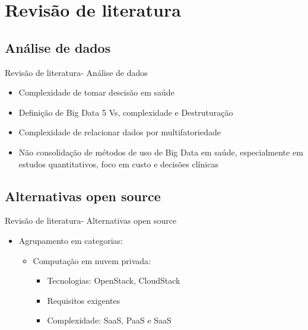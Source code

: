\documentclass[10pt,brazil]{beamer}
\theoremstyle{definition}
\begin{document}
\section{Revisão de literatura}

\subsection{Análise de dados}

\begin{frame}{Revisão de literatura- Análise de dados}
  \begin{itemize}
    \item Complexidade de tomar descisão em saúde \cite{andrade_tomada_2008,resende2009}
    \item Definição de Big Data 5 Vs, complexidade e Destruturação  \cite{laney20013d,oracle2013,intel2012}
    \item Complexidade de relacionar dados por multifatoriedade \cite{faceli2011}
    \item Não consolidação de métodos de uso de Big Data em saúde, especialmente em estudos quantitativos, foco em custo e decisões clínicas \cite{nishita2018}
  \end{itemize}
\end{frame}

\subsection{Alternativas open source}

\begin{frame}{Revisão de literatura- Alternativas open source}
  \begin{itemize}
    \item Agrupamento em categorias:
          \begin{itemize}
            \item Computação em nuvem privada:
                  \begin{itemize}
                    \item Tecnologias: OpenStack\textregistered, CloudStack\textregistered

                    \item Requisitos exigentes
                    \item Complexidade: SaaS, PaaS e SaaS \cite{openstack,cloudstack,mell_nist_2011}
                  \end{itemize}

          \end{itemize}
  \end{itemize}
\end{frame}
\end{document}
